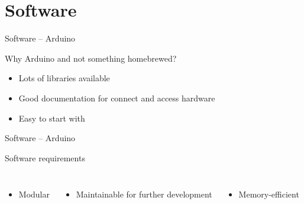 \documentclass{beamer}
\begin{document}
	\section{Software}
	\begin{frame}{Software -- Arduino}
		\vspace{0.7cm}
		\vspace{0.7cm}
		\begin{alertblock}{Why Arduino and not something homebrewed?}
			\begin{itemize}
				\item Lots of libraries available
				\item Good documentation for connect and access hardware
				\item Easy to start with
			\end{itemize}
		\end{alertblock}
	\end{frame}
	
	\begin{frame}[t]{Software -- Arduino}
		\begin{alertblock}{Software requirements}
			\vspace{0.3cm}
			\begin{columns}[T]
					\begin{itemize}
						\item Modular
					\end{itemize}
					\hspace{0.5cm}{\small Adding sensors, adaptable protocol}
					\begin{itemize}
						\item Maintainable for further development
					\end{itemize}
					\begin{itemize}
						\item Memory-efficient
					\end{itemize}
			\end{columns}
		\end{alertblock}
	\end{frame}
	
\end{document}
